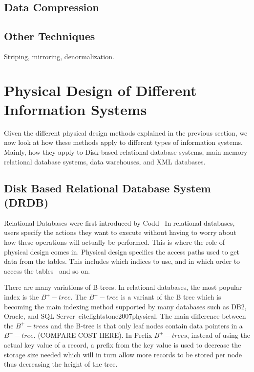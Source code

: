 \documentclass[12pt,a4paper]{article}
\begin{document}
\subsection{Data Compression}

\subsection{Other Techniques}

Striping, mirroring, denormalization.

\section{Physical Design of Different Information Systems}
\label{SEC-DIFFSYS}

Given the different physical design methods explained in the previous section, we now look at how these methods apply to different types of information systems.
Mainly, how they apply to Disk-based relational database systems, main memory relational database systems, data warehouses, and XML databases.


\subsection{Disk Based Relational Database System (DRDB)}
\label{SEC-DDRDB}

Relational Databases were first introduced by Codd~\cite{codd1970relational}
In relational databases, users specify the actions they want to execute without having to worry about how these operations will actually be performed. This is
where the role of physical design comes in. Physical design specifies the access paths used to get data from the tables. This includes which indices to use, and
in which order to access the tables~\cite{finkelstein1988physical} and so on.



There are many variations of B-trees. In relational databases, the most popular index is the $B^{+}-tree$. The $B^{+}-tree$ is a variant of the B  tree which is
becoming the main indexing method supported by many databases such as DB2, Oracle, and SQL Server~cite{lightstone2007physical}. The main difference between the
$B^{+}-trees$ and the B-tree is that only leaf nodes contain data pointers in a $B^{+}-tree$. (COMPARE COST HERE). In Prefix $B^{+}-trees$, instead of using the
actual key value of a record, a prefix from the key value is used to decrease the storage size needed which will in turn allow more records to be stored per
node thus decreasing the height of the tree.
\end{document}
